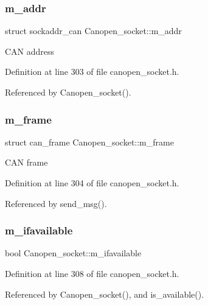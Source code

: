 \subsubsection{\texorpdfstring{m\+\_\+addr}{m\_addr}}
{\footnotesize\ttfamily struct sockaddr\+\_\+can Canopen\+\_\+socket\+::m\+\_\+addr\hspace{0.3cm}{\ttfamily [private]}}

C\+AN address 

Definition at line 303 of file canopen\+\_\+socket.\+h.



Referenced by Canopen\+\_\+socket().

\mbox{\label{class_canopen__socket_a3ef799f7984741623f0ccf5cfd0c6c24}} 
\subsubsection{\texorpdfstring{m\+\_\+frame}{m\_frame}}
{\footnotesize\ttfamily struct can\+\_\+frame Canopen\+\_\+socket\+::m\+\_\+frame\hspace{0.3cm}{\ttfamily [private]}}

C\+AN frame 

Definition at line 304 of file canopen\+\_\+socket.\+h.



Referenced by send\+\_\+msg().

\mbox{\label{class_canopen__socket_a117c72a5f32b1155c74d9435abdde88f}} 
\subsubsection{\texorpdfstring{m\+\_\+ifavailable}{m\_ifavailable}}
{\footnotesize\ttfamily bool Canopen\+\_\+socket\+::m\+\_\+ifavailable\hspace{0.3cm}{\ttfamily [private]}}



Definition at line 308 of file canopen\+\_\+socket.\+h.



Referenced by Canopen\+\_\+socket(), and is\+\_\+available().

